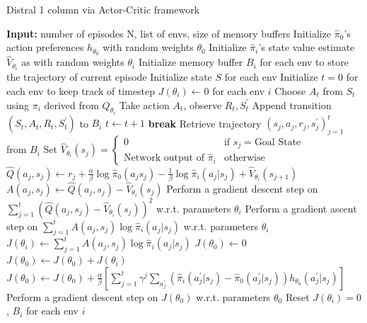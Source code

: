 \documentclass[12pt]{report}
\begin{document}
\begin{algorithm}[H]
\caption{Distral 1 column via Actor-Critic framework}\label{alg:dist1colAC}
\small
\begin{algorithmic}[1]
\State \textbf{Input: } number of episodes N, list of envs, size of memory buffers
\State Initialize $\hat{\pi}_0$'s action preferences $h_{\theta_0}$ with random weights $\theta_0$
\State Initialize $\hat{\pi}_i$'s state value estimate $\hat{V}_{\theta_i}$ as with random weights $\theta_i$
\State Initialize memory buffer $B_i$ for each env to store the trajectory of current episode
\State Initialize state $S$ for each env
\State Initialize $t = 0$ for each env to keep track of timestep
\State $J(\theta_i) \gets 0$ for each env $i$
\State Choose $A_t$ from $S_t$ using $\pi_i$ derived from $Q_{\theta_i}$ \label{peusdo:AC} 
\State Take action $A_t$, observe $R_t, S_t^\prime$
\State Append transition $(S_t,A_t,R_t,S_t^\prime)$ to $B_i$
\State $t \gets t + 1$
\State \textbf{break}
\Else {}
\EndIf
\EndFor
\State Retrieve trajectory $(s_j,a_j,r_j,s_j^\prime)_{j=1}^t$ from $B_i$ 
\State Set $\hat{V}_{\theta_i}(s_j) = \begin{cases} 0 &\mbox{if } s_j = \text{Goal State} \\
\text{Network output of } \hat{\pi}_i  & \mbox{otherwise} \end{cases} $
\State $\hat{Q}(a_j,s_j) \gets r_j + \frac{\alpha}{\beta}\log \hat{\pi}_0(a_j
s_j)-\frac{1}{\beta}\log \hat{\pi}_i(a_j|s_j) + \hat{V}_{\theta_i}(s_{j+1})$
\State $A(a_j, s_j) \gets \hat{Q}(a_j,s_j) - \hat{V}_{\theta_i}(s_j)$
\EndFor
\State Perform a gradient descent step on $\sum_{j=1}^t\left(\hat{Q}(a_j,s_j) - \hat{V}_{\theta_i}(s_j)\right)^2$ w.r.t. parameters $\theta_i$
\State Perform a gradient ascent step on $\sum_{j=1}^t A(a_j, s_j)\log \hat{\pi}_i(a_j|s_j)$ w.r.t. parameters $\theta_i$
\State $J(\theta_i) \gets \sum_{j=1}^t A(a_j, s_j)\log \hat{\pi}_i(a_j|s_j)$
\EndFor
\State $J(\theta_0) \gets 0$
 
\State $J(\theta_0) \gets J(\theta_0) + J(\theta_i)$
\State $J(\theta_0) \gets J(\theta_0) + \frac{\alpha}{\beta}\left[\sum_{j=1}^t \gamma^j \sum_{a^\prime_j}(\hat{\pi}_i(a^\prime_j|s_j)-\hat{\pi}_0(a^\prime_j|s_j))h_{\theta_0}(a^\prime_j|s_j)\right]$ 
\EndFor
\State Perform a gradient descent step on $J(\theta_0)$ w.r.t. parameters $\theta_0$
\State Reset $J(\theta_i) = 0$, $B_i$ for each env $i$
\EndWhile\label{euclidendwhile}
\end{algorithmic}
\end{algorithm}
\end{document}
